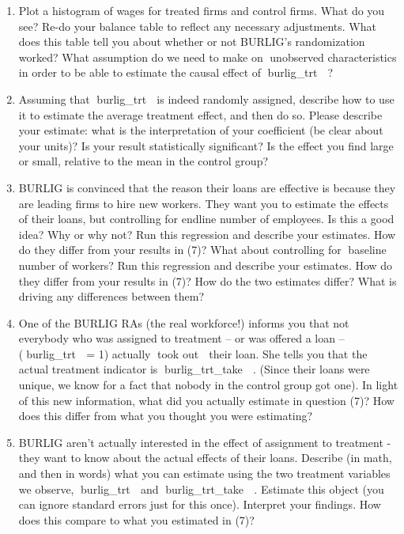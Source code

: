 \documentclass[]{article}
\begin{document}
\begin{enumerate}
\def\labelenumi{\arabic{enumi}.}
\setcounter{enumi}{5}
\item
  Plot a histogram of wages for treated firms and control firms. What do
  you see? Re-do your balance table to reflect any necessary
  adjustments. What does this table tell you about whether or not
  BURLIG's randomization worked? What assumption do we need to make on
  unobserved characteristics in order to be able to estimate the causal
  effect of burlig\_trt  ?
\item
  Assuming that burlig\_trt  is indeed randomly assigned, describe how
  to use it to estimate the average treatment effect, and then do so.
  Please describe your estimate: what is the interpretation of your
  coefficient (be clear about your units)? Is your result statistically
  significant? Is the effect you find large or small, relative to the
  mean in the control group?
\item
  BURLIG is convinced that the reason their loans are effective is
  because they are leading firms to hire new workers. They want you to
  estimate the effects of their loans, but controlling for endline
  number of employees. Is this a good idea? Why or why not? Run this
  regression and describe your estimates. How do they differ from your
  results in (7)? What about controlling for baseline number of
  workers? Run this regression and describe your estimates. How do they
  differ from your results in (7)? How do the two estimates differ? What
  is driving any differences between them?
\item
  One of the BURLIG RAs (the real workforce!) informs you that not
  everybody who was assigned to treatment -- or was offered a loan --
  (burlig\_trt  = 1) actually took out  their loan. She tells you
  that the actual treatment indicator is burlig\_trt\_take  . (Since
  their loans were unique, we know for a fact that nobody in the control
  group got one). In light of this new information, what did you
  actually estimate in question (7)? How does this differ from what you
  thought you were estimating?
\item
  BURLIG aren't actually interested in the effect of assignment to
  treatment - they want to know about the actual effects of their loans.
  Describe (in math, and then in words) what you can estimate using the
  two treatment variables we observe, burlig\_trt  and
  burlig\_trt\_take  . Estimate this object (you can ignore standard
  errors just for this once). Interpret your findings. How does this
  compare to what you estimated in (7)?
\end{enumerate}
\end{document}
